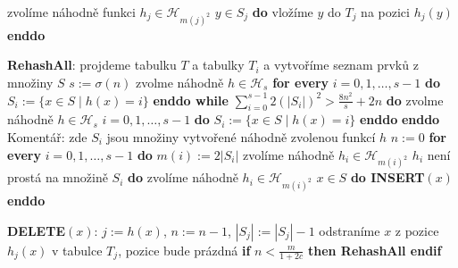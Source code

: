 \documentclass[a4paper,12pt]{article}
\begin{document}
\phantom{---------------}zvolíme náhodně funkci $
h_j\in \mathcal H_{m(j)^2}$\newline 
\phantom{------------}{\bf enddo}\newline 
\phantom{------------}{\bf for every} $y\in S_j$ {\bf do} vložíme $
y$ do $T_j$ na pozici $h_j(y)$ {\bf enddo}\newline 
\phantom{---------}{\bf endif}\newline 
\phantom{------}{\bf endif}\newline 
\phantom{---}{\bf else}\newline 
\phantom{------}{\bf RehashAll}\newline 
\phantom{---}{\bf endif\newline 
endif}


{\bf RehashAll}:\newline 
projdeme tabulku $T$ a tabulky $T_i$ a vytvoříme seznam 
prvků z množiny $S$\newline 
$s:=\sigma(n)$\newline 
zvolme náhodně $h\in \mathcal H_s$ \newline 
{\bf for every} $i=0,1,\dots,s-1$ {\bf do} $S_i:=\{x\in 
S\mid h(x)=i\}$ {\bf enddo\newline 
while} $\sum_{i=0}^{s-1}2(|S_i|)^2>\frac {8n^2}s+2n$ {\bf do}\newline 
\phantom{---}zvolme náhodně $h\in \mathcal H_s$ \newline 
\phantom{---}{\bf for every} $i=0,1,\dots,s-1$ {\bf do} $
S_i:=\{x\in S\mid h(x)=i\}$ {\bf enddo}\newline 
{\bf enddo}\newline
Komentář: zde $S_i$ jsou množiny vytvořené náhodně zvolenou 
funkcí $h$ \newline 
$n:=0$ \newline 
{\bf for every} $i=0,1,\dots,s-1$ {\bf do}\newline 
\phantom{---}$m(i):=2|S_i|$\newline 
\phantom{---}zvolíme náhodně $h_i\in \mathcal H_{m(i
)^2}$\newline 
\phantom{---}{\bf while} $h_i$ není prostá na množině $
S_i$ {\bf do}\newline 
\phantom{------}zvolíme náhodně $h_i\in \mathcal H_{m(i)^2}$\newline 
\phantom{---}{\bf enddo\newline 
enddo\newline 
for every} $x\in S$ {\bf do INSERT$(x)$ enddo}


{\bf DELETE$(x)$}:\newline 
$j:=h(x)$, $n:=n-1$, $|S_j|:=|S_j|-1$\newline 
odstraníme $x$ z pozice $h_j(x)$ v tabulce $T_j$, pozice bude prázdná \newline 
{\bf if} $n<\frac m{1+2c}$ {\bf then RehashAll endif}
\end{document}

